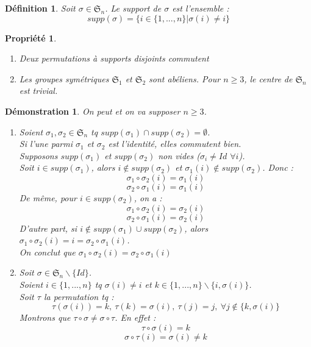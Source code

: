 \documentclass[a4paper, oneside]{report}
\theoremstyle{break}
\newtheorem{defi}[thm]{Définition}
\newtheorem{propr}[thm]{Propriété}
\newtheorem*{demo}{Démonstration}
\renewcommand{\S}{\mathfrak{S}}
\begin{document}
\begin{defi}
	Soit $\sigma \in \S_n$. Le support de $\sigma$ est l'ensemble :
	$$supp(\sigma)=\{i\in \{1,...,n \} | \sigma(i)\neq i \}$$
\end{defi}

\begin{propr}
	\begin{enumerate}
		\item Deux permutations à supports disjoints commutent
		\item Les groupes symétriques $\S_1$ et $\S_2$ sont abéliens. 
		Pour $n\geq 3$, le centre de $\S_n$ est trivial.
	\end{enumerate}	
\end{propr}

\begin{demo}
	On peut et on va supposer $n\geq 3$.
	\begin{enumerate}
		\item Soient $\sigma_1,\sigma_2 \in \S_n$ tq $supp(\sigma_1)\cap supp(\sigma_2) = \emptyset$.\\
		Si l'une parmi $\sigma_1$ et $\sigma_2$ est l'identité, elles commutent bien.\\
		Supposons $supp(\sigma_1)$ et $supp(\sigma_2)$ non vides ($\sigma_i \neq Id$ $\forall i$).\\
		Soit $i\in supp(\sigma_1)$, alors $i\notin supp(\sigma_2)$ et $\sigma_1(i)\notin supp(\sigma_2)$. Donc :
		$$\sigma_1 \circ \sigma_2(i)=\sigma_1(i)$$
		$$\sigma_2 \circ \sigma_1(i)=\sigma_1(i)$$
		De même, pour $i\in supp(\sigma_2)$, on a :
		$$\sigma_1 \circ \sigma_2(i)=\sigma_2(i)$$
		$$\sigma_2 \circ \sigma_1(i)=\sigma_2(i)$$
		D'autre part, si $i\notin supp(\sigma_1)\cup supp(\sigma_2)$, alors $\sigma_1 \circ \sigma_2(i) = i = \sigma_2 \circ \sigma_1(i)$.\\
		On conclut que $\sigma_1 \circ \sigma_2(i)= \sigma_2 \circ \sigma_1(i)$
		
		\item Soit $\sigma \in \S_n \backslash \{Id\}$.\\
		Soient $i\in \{1,...,n\}$ tq $\sigma(i)\neq i$ et $k\in \{1,...,n\}\backslash \{i, \sigma(i) \}$.\\
		Soit $\tau$ la permutation tq :
		$$\tau(\sigma (i))=k,~\tau(k)=\sigma(i),~\tau(j)=j,~\forall j\notin \{k,\sigma(i) \}$$
		Montrons que $\tau \circ \sigma \neq \sigma \circ \tau$. En effet :
		$$\tau \circ \sigma (i) = k$$
		$$\sigma \circ \tau (i) = \sigma(i) \neq k$$
	\end{enumerate}
~
\end{demo}
\end{document}
